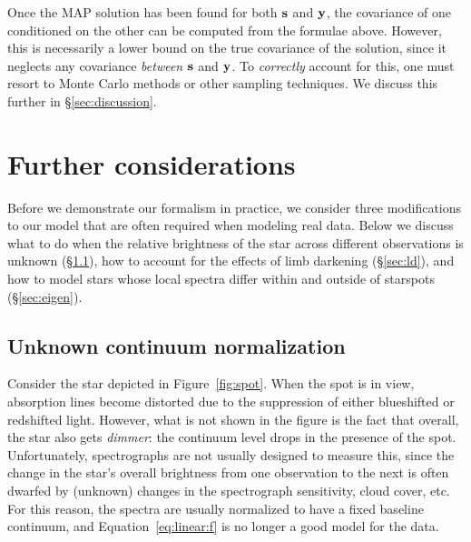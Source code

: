 \documentclass[modern]{aastex631}
\begin{document}
Once the MAP solution has been found for both ${\mathbf{s}}$ and ${\mathbf{y}}$, the covariance of one conditioned on the other can be computed from the formulae above. 
However, this is necessarily a lower bound on the true covariance of the solution, since it neglects any covariance \emph{between} ${\mathbf{s}}$ and ${\mathbf{y}}$. 
To \emph{correctly} account for this, one must resort to Monte Carlo methods or other sampling techniques. 
We discuss this further in \S\ref{sec:discussion}.

\section{Further considerations}
\label{sec:bellswhistles}
%
Before we demonstrate our formalism in practice, we consider three modifications to our model that are often required when modeling real data. 
Below we discuss what to do when the relative brightness of the star across different observations is unknown (\S\ref{sec:norm}), how to account for the effects of limb darkening (\S\ref{sec:ld}), and how to model stars whose local spectra differ within and outside of starspots (\S\ref{sec:eigen}).

\subsection{Unknown continuum normalization}
\label{sec:norm}
%
Consider the star depicted in Figure~\ref{fig:spot}. 
When the spot is in view, absorption lines become distorted due to the suppression of either blueshifted or redshifted light. 
However, what is not shown in the figure is the fact that overall, the star also gets \emph{dimmer}: the continuum level drops in the presence of the spot. 
Unfortunately, spectrographs are not usually designed to measure this, since the change in the star's overall brightness from one observation to the next is often dwarfed by (unknown) changes in the spectrograph sensitivity, cloud cover, etc.
For this reason, the spectra are usually normalized to have a fixed baseline continuum, and Equation~\ref{eq:linear:f} is no longer a good model for the data.
\end{document}
